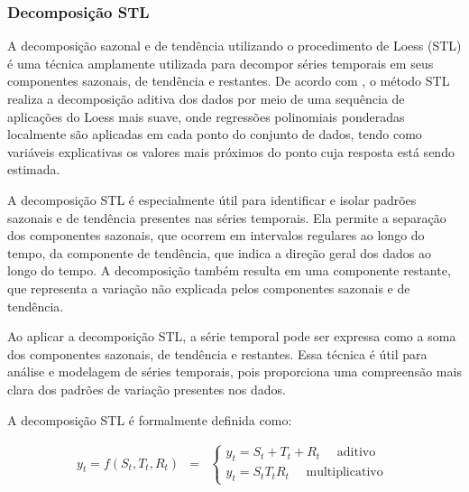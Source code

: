 \subsubsection{Decomposi\c c\~ao STL}\label{subsubsec:stl}

A decomposição sazonal e de tendência utilizando o procedimento de Loess (STL) é uma técnica amplamente utilizada para decompor séries temporais em seus componentes sazonais, de tendência e restantes. De acordo com , o método STL realiza a decomposição aditiva dos dados por meio de uma sequência de aplicações do Loess mais suave, onde regressões polinomiais ponderadas localmente são aplicadas em cada ponto do conjunto de dados, tendo como variáveis explicativas os valores mais próximos do ponto cuja resposta está sendo estimada.

A decomposição STL é especialmente útil para identificar e isolar padrões sazonais e de tendência presentes nas séries temporais. Ela permite a separação dos componentes sazonais, que ocorrem em intervalos regulares ao longo do tempo, da componente de tendência, que indica a direção geral dos dados ao longo do tempo. A decomposição também resulta em uma componente restante, que representa a variação não explicada pelos componentes sazonais e de tendência.

Ao aplicar a decomposição STL, a série temporal pode ser expressa como a soma dos componentes sazonais, de tendência e restantes. Essa técnica é útil para análise e modelagem de séries temporais, pois proporciona uma compreensão mais clara dos padrões de variação presentes nos dados.

A decomposição STL é formalmente definida como:

\begin{eqnarray}
	y_t=f\left(S_t, T_t, R_t\right)&=&\left\{\begin{array}{l}
		y_t=S_t+T_t+R_t \quad \text { aditivo } \\
		y_t=S_t T_t R_t \quad \text { multiplicativo }
	\end{array}\right. \label{eq:stl}
\end{eqnarray}

